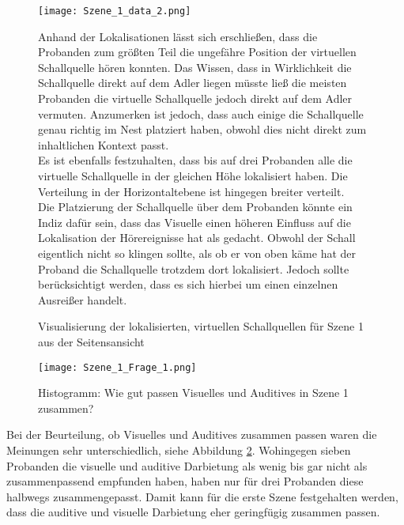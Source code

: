\begin{figure}[H]
\begin{minipage}[t]{7cm}
\vspace{0pt}
\centering
\texttt{[image: Szene\_1\_data\_2.png]}
\caption{Visualisierung der lokalisierten, virtuellen Schallquellen für Szene 1 aus der Seitensansicht}
\label{fig:Szene_1_data_2}
\end{minipage}
\hfill
\begin{minipage}[t]{9.5cm}
\vspace{0pt}

Anhand der Lokalisationen lässt sich erschließen, dass die Probanden zum größten Teil die ungefähre Position der virtuellen Schallquelle hören konnten. Das Wissen, dass in Wirklichkeit die Schallquelle direkt auf dem Adler liegen müsste ließ die meisten Probanden die virtuelle Schallquelle jedoch direkt auf dem Adler vermuten. Anzumerken ist jedoch, dass auch einige die Schallquelle genau richtig im Nest platziert haben, obwohl dies nicht direkt zum inhaltlichen Kontext passt. \\

Es ist ebenfalls festzuhalten, dass bis auf drei Probanden alle die virtuelle Schallquelle in der gleichen Höhe lokalisiert haben. Die Verteilung in der Horizontaltebene ist hingegen breiter verteilt. \\

Die Platzierung der Schallquelle über dem Probanden könnte ein Indiz dafür sein, dass das Visuelle einen höheren Einfluss auf die Lokalisation der Hörereignisse hat als gedacht. Obwohl der Schall eigentlich nicht so klingen sollte, als ob er von oben käme hat der Proband die Schallquelle trotzdem dort lokalisiert. Jedoch sollte berücksichtigt werden, dass es sich hierbei um einen einzelnen Ausreißer handelt.
\end{minipage}
\end{figure}


   \begin{figure}[H]
\centering
\texttt{[image: Szene\_1\_Frage\_1.png]}
\caption{Histogramm: Wie gut passen Visuelles und Auditives in Szene 1 zusammen?}
\label{fig:Szene_1_Frage1}
\end{figure} 

Bei der Beurteilung, ob Visuelles und Auditives zusammen passen waren die Meinungen sehr unterschiedlich, siehe Abbildung \ref{fig:Szene_1_Frage1}. Wohingegen sieben Probanden die visuelle und auditive  Darbietung als wenig bis gar nicht als zusammenpassend empfunden haben, haben nur für drei Probanden diese halbwegs zusammengepasst. Damit kann für die erste Szene festgehalten werden, dass die auditive und visuelle Darbietung eher geringfügig zusammen passen. \\

